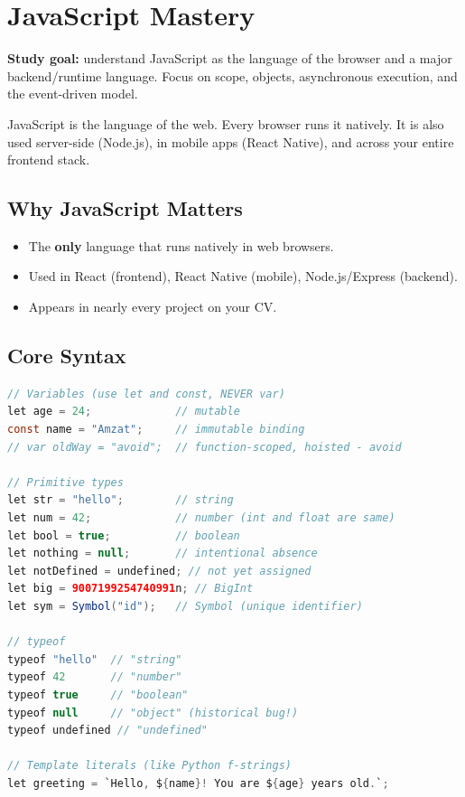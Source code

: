 \documentclass[12pt, a4paper, oneside]{book}
\begin{document}
\chapter{JavaScript Mastery}

\begin{studybox}
\textbf{Study goal:} understand JavaScript as the language of the browser and a major backend/runtime language. Focus on scope, objects, asynchronous execution, and the event-driven model.
\end{studybox}

JavaScript is the language of the web. Every browser runs it natively. It is also used server-side (Node.js), in mobile apps (React Native), and across your entire frontend stack.

\section{Why JavaScript Matters}
\begin{itemize}[leftmargin=2em]
    \item The \textbf{only} language that runs natively in web browsers.
    \item Used in React (frontend), React Native (mobile), Node.js/Express (backend).
    \item Appears in nearly every project on your CV.
\end{itemize}

\section{Core Syntax}

\begin{lstlisting}[language=Java, caption={JavaScript variables and types}]
// Variables (use let and const, NEVER var)
let age = 24;             // mutable
const name = "Amzat";     // immutable binding
// var oldWay = "avoid";  // function-scoped, hoisted - avoid

// Primitive types
let str = "hello";        // string
let num = 42;             // number (int and float are same)
let bool = true;          // boolean
let nothing = null;       // intentional absence
let notDefined = undefined; // not yet assigned
let big = 9007199254740991n; // BigInt
let sym = Symbol("id");   // Symbol (unique identifier)

// typeof
typeof "hello"  // "string"
typeof 42       // "number"
typeof true     // "boolean"
typeof null     // "object" (historical bug!)
typeof undefined // "undefined"

// Template literals (like Python f-strings)
let greeting = `Hello, ${name}! You are ${age} years old.`;
\end{lstlisting}
\end{document}
